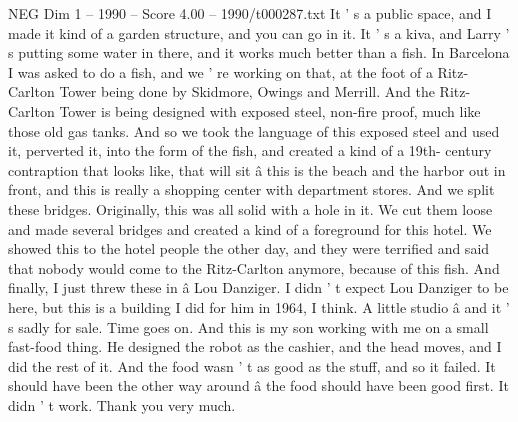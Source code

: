 \begin{textsample}{NEG Dim 1 – 1990 – Score 4.00 – 1990/t000287.txt}
It ' s a public space, and I made it kind of a garden structure, and you can go in it.
It ' s a kiva, and Larry ' s putting some water in there, and it works much better than a fish.
In Barcelona I was asked to do a fish, and we ' re working on that, at the foot of a Ritz-Carlton Tower being done by Skidmore, Owings and Merrill.
And the Ritz-Carlton Tower is being designed with exposed steel, non-fire proof, much like those old gas tanks.
And so we took the language of this exposed steel and used it, perverted it, into the form of the fish, and created a kind of a 19th- century contraption that looks like, that will sit â this is the beach and the harbor out in front, and this is really a shopping center with department stores.
And we split these bridges.
Originally, this was all solid with a hole in it.
We cut them loose and made several bridges and created a kind of a foreground for this hotel.
We showed this to the hotel people the other day, and they were terrified and said that nobody would come to the Ritz-Carlton anymore, because of this fish.
And finally, I just threw these in â Lou Danziger.
I didn ' t expect Lou Danziger to be here, but this is a building I did for him in 1964, I think.
A little studio â and it ' s sadly for sale.
Time goes on.
And this is my son working with me on a small fast-food thing.
He designed the robot as the cashier, and the head moves, and I did the rest of it.
And the food wasn ' t as good as the stuff, and so it failed.
It should have been the other way around â the food should have been good first.
It didn ' t work.
Thank you very much.

\end{textsample}
